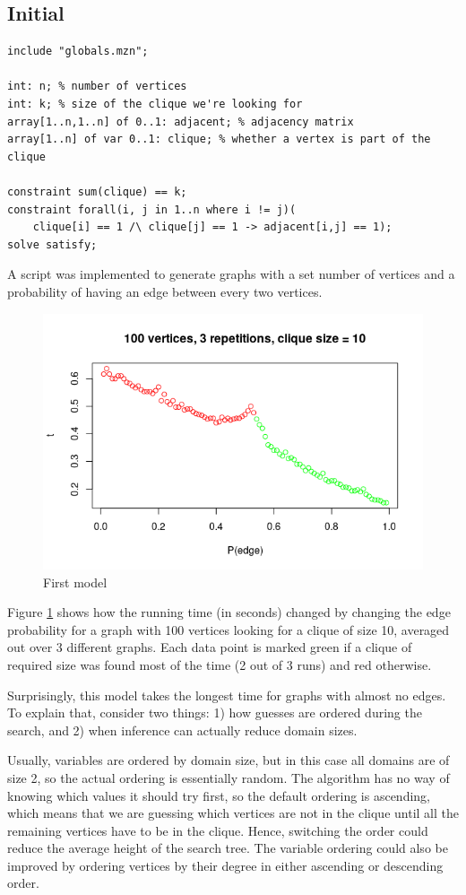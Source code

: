 \documentclass{article}
\begin{document}
\subsection{Initial}
\begin{lstlisting}
include "globals.mzn";

int: n; % number of vertices
int: k; % size of the clique we're looking for
array[1..n,1..n] of 0..1: adjacent; % adjacency matrix
array[1..n] of var 0..1: clique; % whether a vertex is part of the clique

constraint sum(clique) == k;
constraint forall(i, j in 1..n where i != j)(
    clique[i] == 1 /\ clique[j] == 1 -> adjacent[i,j] == 1);
solve satisfy;
\end{lstlisting}
A script was implemented to generate graphs with a set number of vertices and a probability of having an edge between every two vertices.
\begin{figure}
  \includegraphics[scale=0.5]{max_clique.png}
  \caption{First model}
  \label{fig:initial_max_clique}
\end{figure}
Figure \ref{fig:initial_max_clique} shows how the running time (in seconds) changed by changing the edge probability for a graph with 100 vertices looking for a clique of size 10, averaged out over 3 different graphs. Each data point is marked green if a clique of required size was found most of the time (2 out of 3 runs) and red otherwise.

Surprisingly, this model takes the longest time for graphs with almost no edges. To explain that, consider two things: 1) how guesses are ordered during the search, and 2) when inference can actually reduce domain sizes.

Usually, variables are ordered by domain size, but in this case all domains are of size 2, so the actual ordering is essentially random. The algorithm has no way of knowing which values it should try first, so the default ordering is ascending, which means that we are guessing which vertices are not in the clique until all the remaining vertices have to be in the clique. Hence, switching the order could reduce the average height of the search tree. The variable ordering could also be improved by ordering vertices by their degree in either ascending or descending order.
\end{document}
